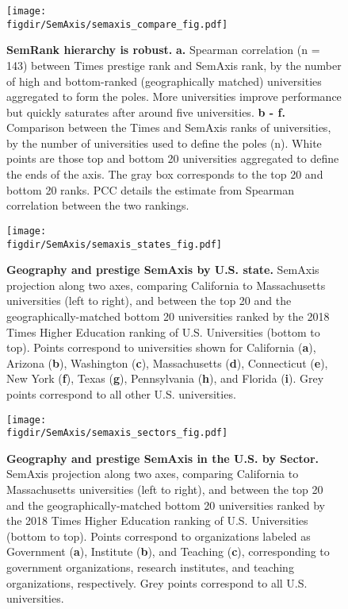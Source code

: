 \documentclass[12pt]{article} %
\def\figdir{../Figs}
\begin{document}
%
%
\begin{figure}[hp!]
    \centering
    \label{fig:supp:semaxis_compare}
    \texttt{[image: \\figdir/SemAxis/semaxis\_compare\_fig.pdf]}
    \caption{
        \textbf{SemRank hierarchy is robust.}
        \textbf{a.} Spearman correlation (n = 143) between Times prestige rank and SemAxis rank, by the number of high and bottom-ranked (geographically matched) universities aggregated to form the poles. 
        More universities improve performance but quickly saturates after around five universities. 
        \textbf{b - f.} Comparison between the Times and SemAxis ranks of universities, by the number of universities used to define the poles (n). 
        White points are those top and bottom 20 universities aggregated to define the ends of the axis. 
        The gray box corresponds to the top 20 and bottom 20 ranks. 
          PCC details the estimate from Spearman correlation between the two rankings. 
    }
\end{figure}


%
%
\begin{figure}[hp!]
    \centering
    \label{fig:supp:semaxis_states}
    \texttt{[image: \\figdir/SemAxis/semaxis\_states\_fig.pdf]}
    \caption{
        \textbf{Geography and prestige SemAxis by U.S. state.}
        SemAxis projection along two axes, comparing California to Massachusetts universities (left to right), and between the top 20 and the geographically-matched bottom 20 universities ranked by the 2018 Times Higher Education ranking of U.S. Universities (bottom to top). 
        Points correspond to universities shown for California (\textbf{a}), Arizona (\textbf{b}), Washington (\textbf{c}), Massachusetts (\textbf{d}), Connecticut (\textbf{e}), New York (\textbf{f}), Texas (\textbf{g}), Pennsylvania (\textbf{h}), and Florida (\textbf{i}).
        Grey points correspond to all other U.S. universities. 
    }
\end{figure}


%
%
\begin{figure}[hp!]
    \centering
    \label{fig:supp:semaxis_sectors}
    \texttt{[image: \\figdir/SemAxis/semaxis\_sectors\_fig.pdf]}
    \caption{
        \textbf{Geography and prestige SemAxis in the U.S. by Sector.}
        SemAxis projection along two axes, comparing California to Massachusetts universities (left to right), and between the top 20 and the geographically-matched bottom 20 universities ranked by the 2018 Times Higher Education ranking of U.S. Universities (bottom to top). 
        Points correspond to organizations labeled as Government (\textbf{a}), Institute (\textbf{b}), and Teaching (\textbf{c}), corresponding to government organizations, research institutes, and teaching organizations, respectively.
        Grey points correspond to all U.S. universities.  
    }
\end{figure}




\clearpage
\printbibliography{}
    
\end{document}
